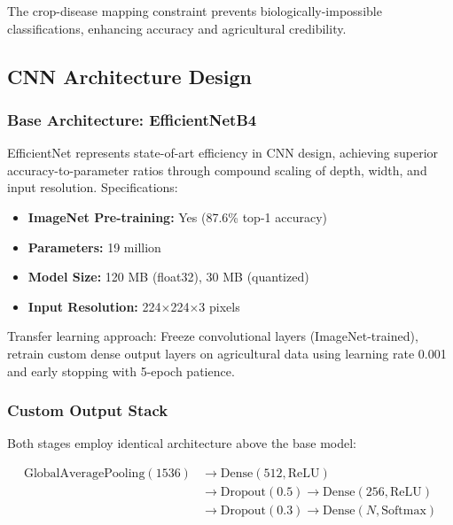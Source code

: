 \documentclass[conference]{IEEEtran}
\begin{document}
The crop-disease mapping constraint prevents biologically-impossible classifications, enhancing accuracy and agricultural credibility.

\subsection{CNN Architecture Design}

\subsubsection{Base Architecture: EfficientNetB4}

EfficientNet represents state-of-art efficiency in CNN design, achieving superior accuracy-to-parameter ratios through compound scaling of depth, width, and input resolution. Specifications:

\begin{itemize}
\item \textbf{ImageNet Pre-training:} Yes (87.6\% top-1 accuracy)
\item \textbf{Parameters:} 19 million
\item \textbf{Model Size:} 120 MB (float32), 30 MB (quantized)
\item \textbf{Input Resolution:} 224$\times$224$\times$3 pixels
\end{itemize}

Transfer learning approach: Freeze convolutional layers (ImageNet-trained), retrain custom dense output layers on agricultural data using learning rate 0.001 and early stopping with 5-epoch patience.

\subsubsection{Custom Output Stack}

Both stages employ identical architecture above the base model:

\begin{equation}
\begin{aligned}
\text{GlobalAveragePooling}(1536) &\rightarrow \text{Dense}(512, \text{ReLU}) \\
&\rightarrow \text{Dropout}(0.5) \rightarrow \text{Dense}(256, \text{ReLU}) \\
&\rightarrow \text{Dropout}(0.3) \rightarrow \text{Dense}(N, \text{Softmax})
\end{aligned}
\end{equation}
\end{document}
